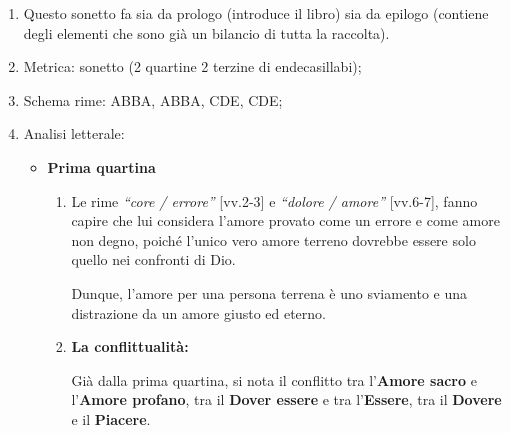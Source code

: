 \documentclass{article}
\begin{document}
\begin{enumerate}
    \item Questo sonetto fa sia da prologo (introduce il libro) sia da epilogo
        (contiene degli elementi che sono già un bilancio di tutta la raccolta).
    \item Metrica: sonetto (2 quartine 2 terzine di endecasillabi);
    \item Schema rime: ABBA, ABBA, CDE, CDE;
    \item Analisi letterale:
    \begin{itemize}[label=]
        \item \textbf{Prima quartina}
        \begin{enumerate}[label=]
             il sonetto si apre con un'invocazione verso il
            lettore (apostrofe);
         indica la forma della raccolta, ossia frammenti di
            poesie sparse autonome;
         indica il
            contenuto del canzoniere, infatti questo enjambement indica l'amore;
         è l'elemento che fa capire al lettore che questo sonetto non è
            stato scritto prima della raccolta di poesie, infatti esso funge anche da
            \underline{epilogo}, poiché dice che il suo amore che canterà è stato un errore;
         sta ad indicare che Petrarca non ha ancora superato 
            completamente il suo amore sbagliato;
        \item Le rime \textit{``core / errore''} [vv.2-3] e \textit{``dolore / amore''}
            [vv.6-7], fanno capire che lui considera l'amore provato come un errore e come
            amore non degno, poiché l'unico vero amore terreno dovrebbe essere solo quello nei
            confronti di Dio.

            Dunque, l'amore per una persona terrena è uno sviamento e una distrazione da un
            amore giusto ed eterno.\\
            \phantom{}

            \item \textbf{La conflittualità:}

            Già dalla prima quartina, si nota il conflitto tra l'\textbf{Amore sacro} e
            l'\textbf{Amore profano}, tra il \textbf{Dover essere} e tra l'\textbf{Essere},
            tra il \textbf{Dovere} e il \textbf{Piacere}.


\end{enumerate}
\end{itemize}
\end{enumerate}
\end{document}
